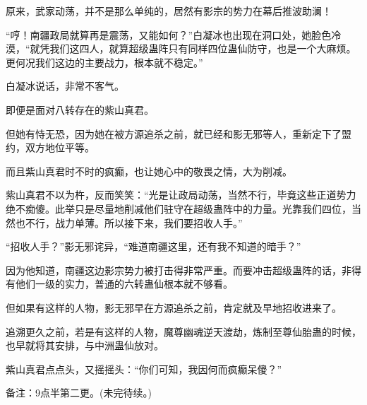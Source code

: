 \begin{this_body}
原来，武家动荡，并不是那么单纯的，居然有影宗的势力在幕后推波助澜！

“哼！南疆政局就算再是震荡，又能如何？”白凝冰也出现在洞口处，她脸色冷漠，“就凭我们这四人，就算超级蛊阵只有同样四位蛊仙防守，也是一个大麻烦。更何况我们这边的主要战力，根本就不稳定。”

白凝冰说话，非常不客气。

即便是面对八转存在的紫山真君。

但她有恃无恐，因为她在被方源追杀之前，就已经和影无邪等人，重新定下了盟约，双方地位平等。

而且紫山真君时不时的疯癫，也让她心中的敬畏之情，大为削减。

紫山真君不以为杵，反而笑笑：“光是让政局动荡，当然不行，毕竟这些正道势力绝不痴傻。此举只是尽量地削减他们驻守在超级蛊阵中的力量。光靠我们四位，当然也不行，战力单薄。所以接下来，我们要招收人手。”

“招收人手？”影无邪诧异，“难道南疆这里，还有我不知道的暗手？”

因为他知道，南疆这边影宗势力被打击得非常严重。而要冲击超级蛊阵的话，非得有他们一级的实力，普通的六转蛊仙根本就不够看。

但如果有这样的人物，影无邪早在方源追杀之前，肯定就及早地招收进来了。

追溯更久之前，若是有这样的人物，魔尊幽魂逆天渡劫，炼制至尊仙胎蛊的时候，也早就将其安排，与中洲蛊仙放对。

紫山真君点点头，又摇摇头：“你们可知，我因何而疯癫呆傻？”

备注：9点半第二更。(未完待续。)

\end{this_body}

